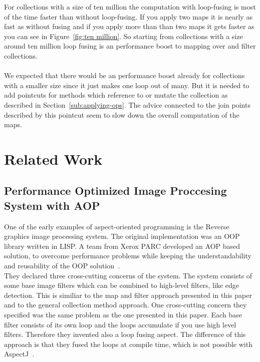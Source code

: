 \documentclass[runningheads,a4paper]{llncs}
\begin{document}
For collections with a size of ten million the computation with loop-fusing is most of the time faster than without loop-fusing.
If you apply two maps it is nearly as fast as without fusing and if you apply more than than two maps it gets faster as you can see in Figure~\ref{fig:ten million}.
So starting from collections with a size around ten million loop fusing is an performance boost to mapping over and filter collections.\\
\\
We expected that there would be an performance boost already for collections with a smaller size since it just makes one loop out of many.
But it is needed to add pointcuts for methods which reference to or mutate the collection as described in Section~\ref{sub:applying-ops}.
The advice connected to the join points described by this pointcut seem to slow down the overall computation of the maps.

\section{Related Work}\label{sec:related-work}

\subsection{Performance Optimized Image Proccesing System with AOP}
One of the early examples of aspect-oriented programming is the Reverse graphics image processing system. The original implementation was an OOP library written in LISP.
A team from Xerox PARC developed an AOP based solution, to overcome performance problems while keeping the understandability and reusability of the OOP solution~\cite{mendhekar1997rg}.\\
They declared three cross-cutting concerns of the system.
The system consists of some base image filters which can be combined to high-level filters, like edge detection.
This is similiar to the map and filter approach presented in this paper and to the general collection method approach.
One cross-cutting concern they specified was the same problem as the one presented in this paper. Each base filter consists of its own loop and the loops accumulate if you use high level filters.
Therefore they invented also a loop fusing aspect. The difference of this approach is that they fused the loops at compile time, which is not possible with AspectJ~\cite{mendhekar1997rg}.
\end{document}
